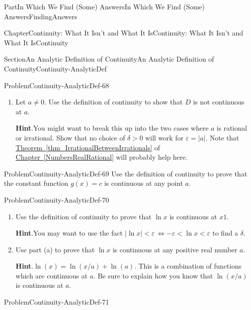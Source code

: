 \documentclass[oneside,10pt,]{book}
\newcommand{\blocktitlefont}{\relax}
\newcommand{\xreffont}{\relax}
\numberwithin{equation}{part}
\newcommand{\abs}[1]{\left|#1\right|}
\newcommand{\eps}{\varepsilon}
\newcommand{\lt}{<}
\newcommand{\amp}{&}
\begin{document}
\begin{partptx}{Part}{In Which We Find (Some) Answers}{}{In Which We Find (Some) Answers}{}{}{FindingAnswers}
\begin{chapterptx}{Chapter}{Continuity: What It Isn't and What It Is}{}{Continuity: What It Isn't and What It Is}{}{}{Continuity}
\begin{sectionptx}{Section}{An Analytic Definition of Continuity}{}{An Analytic Definition of Continuity}{}{}{Continuity-AnalyticDef}
\begin{problem}{Problem}{}{Continuity-AnalyticDef-68}
\begin{enumerate}[font=\bfseries,label=(\alph*),ref=\alph*]
\begin{equation*}
D(x)= \begin{cases}
x,\amp \text{ if } x\text{ is rational } \\
0,\amp \text{ if } x\text{ is irrational } \end{cases} 
\end{equation*}
is continuous at \(0\).%
\item{}Let \(a\neq 0\).  Use the definition of continuity to show that \(D\) is not continuous at \(a\).%
\par\smallskip%
\noindent\textbf{\blocktitlefont Hint}.\hypertarget{Continuity-AnalyticDef-68-3-2}{}\quad{}You might want to break this up into the two cases where \(a\) is rational or irrational.  Show that no choice of \(\delta>0\) will work for \(\eps=\abs{a}\).  Note that \hyperref[thm_IrrationalBetweenIrrationals]{Theorem~{\xreffont\ref{thm_IrrationalBetweenIrrationals}}} of \hyperref[NumbersRealRational]{Chapter~{\xreffont\ref{NumbersRealRational}}} will probably help here.%
\end{enumerate}%
\end{problem}
\begin{problem}{Problem}{}{Continuity-AnalyticDef-69}%
Use the definition of continuity to prove that the constant function \(g(x)=c\) is continuous at any point \(a\).%
\end{problem}
\begin{problem}{Problem}{}{Continuity-AnalyticDef-70}%
\begin{enumerate}[font=\bfseries,label=(\alph*),ref=\alph*]%
\item{}Use the definition of continuity to prove that \(\ln x\) is continuous at \(x1\).%
\par\smallskip%
\noindent\textbf{\blocktitlefont Hint}.\hypertarget{Continuity-AnalyticDef-70-3-2}{}\quad{}You may want to use the fact \(\abs{\ln x}\lt
\eps\,\Leftrightarrow-\eps\lt \ln x\lt \eps\) to find a \(\delta\).%
\item{}Use part (a) to prove that \(\ln x\) is continuous at any positive real number \(a\).%
\par\smallskip%
\noindent\textbf{\blocktitlefont Hint}.\hypertarget{Continuity-AnalyticDef-70-4-2}{}\quad{}\(\ln(x)=\ln(x/a)+\ln(a)\).  This is a combination of functions which are continuous at \(a\).  Be sure to explain how you know that \(\ln(x/a)\) is continuous at \(a\).%
\end{enumerate}%
\end{problem}
\begin{problem}{Problem}{}{Continuity-AnalyticDef-71}%

\end{problem}
\end{sectionptx}
\end{chapterptx}
\end{partptx}
\end{document}
